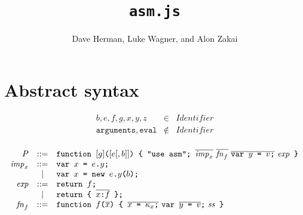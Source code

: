 \documentclass{article}
\newcommand{\funcall}[2]{{#1}\mathjs{(}{#2}\mathjs{)}}
\newcommand{\seq}[1]{\overline{{#1}}}
\newcommand{\mathjs}[1]{\mbox{\texttt{{#1}}}}
\newcommand{\return}[1]{\mathjs{return }{#1}\mathjs{;}}
\newcommand{\fun}[3]{\mathjs{function }{#1}\mathjs{(}{#2}\mathjs{) \char123{} }{#3}\mathjs{ \char125{}}}
\newcommand{\var}[1]{\mathjs{var }{#1}\mathjs{;}}
\begin{document}
\title{\texttt{asm.js}}
\author{Dave Herman, Luke Wagner, and Alon Zakai}
\maketitle

\section{Abstract syntax}

\[
\begin{array}{rcl}
b, e, f, g, x, y, z               & \in & \mathit{Identifier} \\
\mathtt{arguments}, \mathtt{eval} & \not\in & \mathit{Identifier} \\
\end{array}
\]

\[
\begin{array}{rcl}
P               & ::= & \fun{[g]}{[e[, b]]}{\mathjs{"use asm"; } \seq{\mathit{imp}_x}\ \seq{\mathit{fn}_f}\ \seq{\var{y \mathjs{ = } v}}\ \mathit{exp}} \\
\mathit{imp}_x  & ::= & \var{x \mathjs{ = } e\mathjs{.}y} \\
                &  |  & \var{x \mathjs{ = } \mathjs{new }\funcall{e\mathjs{.}y}{b}} \\
\mathit{exp}    & ::= & \return{f} \\
                &  |  & \return{\mathjs{\char123{} } \seq{x \mathjs{:} f} \mathjs{ \char125{}}} \\
\mathit{fn}_f   & ::= & \fun{f}{\seq{x}}{\seq{x\mathjs{ = }\kappa_x\mathjs{;}}\ \var{\seq{y\mathjs{ = }v}}\ \mathit{ss}} \\
\end{array}
\]
\end{document}
